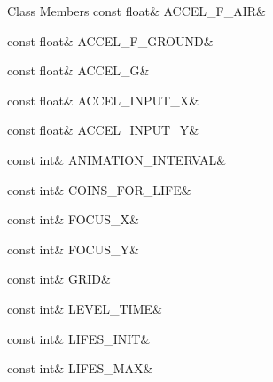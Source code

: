 \begin{DoxyFields}{Class Members}
\mbox{\label{namespaceMelloMario_1_1Theming_ab5188be59a7037ecd14f7508a6b3f36c}} 
const float&
ACCEL\_F\_AIR&
\\
\hline

\mbox{\label{namespaceMelloMario_1_1Theming_a9abe32c33007e9b5835d4cafb9024f7b}} 
const float&
ACCEL\_F\_GROUND&
\\
\hline

\mbox{\label{namespaceMelloMario_1_1Theming_a8ba8f68900997583daa72348c8b36cfa}} 
const float&
ACCEL\_G&
\\
\hline

\mbox{\label{namespaceMelloMario_1_1Theming_aa99a0e24b14f15b44b1e24b06fda40ea}} 
const float&
ACCEL\_INPUT\_X&
\\
\hline

\mbox{\label{namespaceMelloMario_1_1Theming_ab32cec0f1541da51b87117e6dddb5ed6}} 
const float&
ACCEL\_INPUT\_Y&
\\
\hline

\mbox{\label{namespaceMelloMario_1_1Theming_a5d8ff3118efc0472d6b44725e3da913e}} 
const int&
ANIMATION\_INTERVAL&
\\
\hline

\mbox{\label{namespaceMelloMario_1_1Theming_a66d79ec2d8b5b3197e2e06056929cf14}} 
const int&
COINS\_FOR\_LIFE&
\\
\hline

\mbox{\label{namespaceMelloMario_1_1Theming_a75868d49f94ccca23ed4380cdd391096}} 
const int&
FOCUS\_X&
\\
\hline

\mbox{\label{namespaceMelloMario_1_1Theming_aa72f4aa0ba10caf315ce067c4e9e27c9}} 
const int&
FOCUS\_Y&
\\
\hline

\mbox{\label{namespaceMelloMario_1_1Theming_aebe2ee0d8dc8c7dbe162dbb23e018357}} 
const int&
GRID&
\\
\hline

\mbox{\label{namespaceMelloMario_1_1Theming_a65301f1d43c8ee521ec1744f18e751dd}} 
const int&
LEVEL\_TIME&
\\
\hline

\mbox{\label{namespaceMelloMario_1_1Theming_a9bed2411c6322476332e769fc70321fc}} 
const int&
LIFES\_INIT&
\\
\hline

\mbox{\label{namespaceMelloMario_1_1Theming_a7abf4cd12d6edb98f7df6c2836b3bb8d}} 
const int&
LIFES\_MAX&
\\
\hline


\end{DoxyFields}
